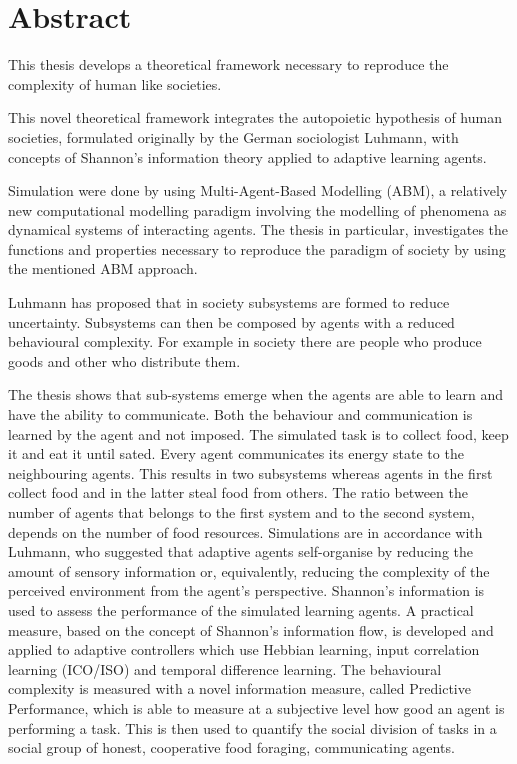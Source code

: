 \documentclass{book}
\begin{document}
\section*{Abstract}
\begin{minipage}[center]{1.0\textwidth}
This thesis develops a theoretical framework necessary to reproduce the 
complexity of human like societies.

This novel theoretical framework integrates the autopoietic hypothesis of human
societies, formulated originally by the German sociologist Luhmann, with concepts
of Shannon's information theory applied to adaptive learning agents.

Simulation were done by using Multi-Agent-Based Modelling (ABM), 
a relatively new computational modelling paradigm involving 
the modelling of phenomena as dynamical systems of interacting agents. 
The thesis in particular, investigates the functions and properties necessary to 
reproduce the paradigm of society by using the mentioned ABM approach.

Luhmann has proposed that in society subsystems are formed to reduce
uncertainty. 
Subsystems can then be composed by agents with a reduced behavioural complexity.
For example in society there are people who produce goods and other who
distribute them. 

The thesis shows that sub-systems emerge when the
agents are able to learn and have the ability to communicate.
Both the behaviour and communication is learned by the agent and not imposed.
The simulated task is to collect food, keep it and eat it until
sated. Every agent communicates its energy state to the neighbouring agents.
This results in two subsystems whereas agents in the first collect food and in
the latter steal food from others. The ratio between the number of agents that
belongs to the first system and to the second system, depends on the number of
food resources.
Simulations are in accordance with Luhmann, who 
suggested that adaptive agents self-organise by reducing the amount of sensory 
information or, equivalently, reducing the complexity of the
perceived environment from the agent's perspective. 
Shannon's information is used to assess the performance of the simulated learning
agents.
A practical measure, based on the concept of Shannon's information flow, 
is developed and applied to adaptive controllers which use Hebbian learning, input
correlation learning (ICO/ISO) and
temporal difference learning.
The behavioural complexity 
is measured with a novel information measure, called Predictive Performance, which 
is able to measure at a subjective level how good an agent is performing a task.
This is then used to quantify the social division of tasks in a social group of 
honest, cooperative food foraging, communicating agents.
\end{minipage}
\end{document}
